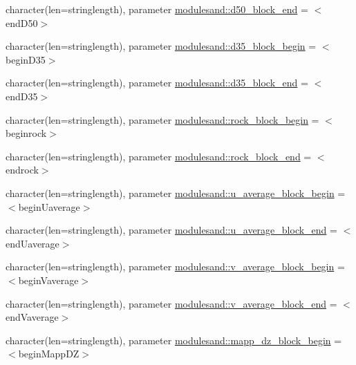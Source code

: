 \begin{DoxyCompactItemize}
character(len=stringlength), parameter \mbox{\hyperlink{namespacemodulesand_a96c437c16b4759e6388e3659d6eac486}{modulesand\+::d50\+\_\+block\+\_\+end}} = \textquotesingle{}$<$end\+D50$>$\textquotesingle{}
\item 
character(len=stringlength), parameter \mbox{\hyperlink{namespacemodulesand_ab0757e9853006bd56c73d1d2e9364af0}{modulesand\+::d35\+\_\+block\+\_\+begin}} = \textquotesingle{}$<$begin\+D35$>$\textquotesingle{}
\item 
character(len=stringlength), parameter \mbox{\hyperlink{namespacemodulesand_a0ac002d2a3d1be2ec51cfd17da32e116}{modulesand\+::d35\+\_\+block\+\_\+end}} = \textquotesingle{}$<$end\+D35$>$\textquotesingle{}
\item 
character(len=stringlength), parameter \mbox{\hyperlink{namespacemodulesand_a7da6be1e098a2edd5c92923bfbf75746}{modulesand\+::rock\+\_\+block\+\_\+begin}} = \textquotesingle{}$<$beginrock$>$\textquotesingle{}
\item 
character(len=stringlength), parameter \mbox{\hyperlink{namespacemodulesand_a33095858e39945eed4d56fc67dc8a546}{modulesand\+::rock\+\_\+block\+\_\+end}} = \textquotesingle{}$<$endrock$>$\textquotesingle{}
\item 
character(len=stringlength), parameter \mbox{\hyperlink{namespacemodulesand_ae1bb22f3a20787f4780916afec5b06a4}{modulesand\+::u\+\_\+average\+\_\+block\+\_\+begin}} = \textquotesingle{}$<$begin\+Uaverage$>$\textquotesingle{}
\item 
character(len=stringlength), parameter \mbox{\hyperlink{namespacemodulesand_a119ec2cbb9dd408931f9313462a82e16}{modulesand\+::u\+\_\+average\+\_\+block\+\_\+end}} = \textquotesingle{}$<$end\+Uaverage$>$\textquotesingle{}
\item 
character(len=stringlength), parameter \mbox{\hyperlink{namespacemodulesand_ac7fa16fb5226094713f82fcffe0220e5}{modulesand\+::v\+\_\+average\+\_\+block\+\_\+begin}} = \textquotesingle{}$<$begin\+Vaverage$>$\textquotesingle{}
\item 
character(len=stringlength), parameter \mbox{\hyperlink{namespacemodulesand_a1d8c89cafe87ef657aedd36384f37d22}{modulesand\+::v\+\_\+average\+\_\+block\+\_\+end}} = \textquotesingle{}$<$end\+Vaverage$>$\textquotesingle{}
\item 
character(len=stringlength), parameter \mbox{\hyperlink{namespacemodulesand_a3929a480a9b443724c6ffdd34b729dec}{modulesand\+::mapp\+\_\+dz\+\_\+block\+\_\+begin}} = \textquotesingle{}$<$begin\+Mapp\+DZ$>$\textquotesingle{}
\item 

\end{DoxyCompactItemize}

